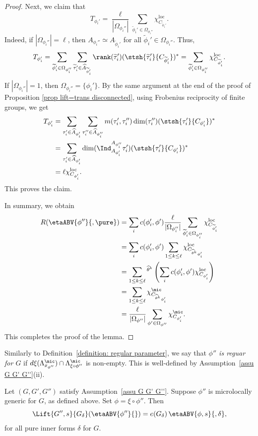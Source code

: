 \documentclass[11pt,letterpaper]{amsart}
\numberwithin{equation}{section}
\begin{document}
\begin{proof}
Next, we claim that 
\[ T_{\phi_i'}= \frac{\ell}{ |\Omega_{\phi_i''}|} \sum_{\widetilde{\phi}_i' \in \Omega_{\phi_i''}} \chi^\textrm{loc}_{C_{\widetilde{\phi}_i'}} .\]
Indeed, if $|\Omega_{\phi_i''}|= \ell$, then $A_{\phi_i''} \simeq  A_{\widetilde{\phi}_i'}$ for all $\widetilde{\phi}_i' \in \Omega_{\phi_i''}$. Thus, 
\[ T_{\phi_{i}'}= \sum_{\widetilde{\phi}_i' \in \Omega_{\phi_i''}} \sum_{\widetilde{\tau}_i' \in \widehat{A}_{\widetilde{\phi}_i'}} \rank(\widetilde{\tau}_i') (\stsh{\widetilde{\tau}_i'}{C_{\widetilde{\phi}_i'}})^{\ast} = \sum_{\widetilde{\phi}_i' \in \Omega_{\phi_i''}} \chi^\textrm{loc}_{C_{\widetilde{\phi}_i'}}.\]
If $|\Omega_{\phi_i''}|= 1$, then $\Omega_{\phi_i''}=\{\phi_i'\}$. By the same argument at the end of the proof of Proposition \ref{prop lift=trans disconnected}, using Frobenius reciprocity of finite groups, we get   
\begin{align*}
   T_{\phi_{i}'}&= \sum_{\tau_i' \in \widehat{A}_{\phi_i'}} \sum_{{\tau}_i'' \in \widehat{A}_{\phi_i''}} m({\tau}_i', \tau_i'') \dim(\tau_i'') (\stsh{{\tau}_i'}{C_{{\phi}_i'}})^{\ast}\\
   &= \sum_{{\tau}_i' \in \widehat{A}_{{\phi}_i'}} \dim(\Ind_{A_{\phi_i'}}^{A_{\phi_i''}}\tau_i')(\stsh{{\tau}_i'}{C_{{\phi}_i'}})^{\ast}\\
   &= \ell \chi^\textrm{loc}_{C_{\phi_i'}}.
\end{align*}
This proves the claim.

In summary, we obtain
\begin{align*}
    R( \etaABV{\phi''}{,\pure})& = \sum_{i}c(\phi_i', \phi') \frac{\ell}{ |\Omega_{\phi_i''}|} \sum_{\widetilde{\phi}_i' \in \Omega_{\phi_i''}} \chi^\textrm{loc}_{C_{\widetilde{\phi}_i'}}\\
    &= \sum_{i}c(\phi_i', \phi') \sum_{1 \leq k \leq \ell}\chi^\textrm{loc}_{C_{{}^{\widehat{\theta}^k} \phi_i'}} \\
    &=  \sum_{1 \leq k \leq \ell} {}^{\widehat{\theta}^k}\left(\sum_{i}c(\phi_i', \phi')\chi^\textrm{loc}_{C_{ \phi_i'}}\right)\\
    &= \sum_{1 \leq k \leq \ell}  \chi^{\mic}_{C_{{}^{\widehat{\theta}^k}\phi_i'}}\\
    &= \frac{\ell}{|\Omega_{\phi''}|} \sum_{\phi' \in \Omega_{\phi''}} \chi^{\mic}_{C_{\phi_i'}}.
\end{align*}
This completes the proof of the lemma.
\end{proof}


Similarly to Definition~\ref{definition: regular parameter}, we say that {\it $\phi''$ is reguar for $G$} if $d\xi(\Lambda_{x_{\phi''}}^\mic) \cap \Lambda_{\xi\circ\phi''}^\mic$ is non-empty.
This is well-defined by Assumption~\ref{assu G G' G''}(ii).
\begin{proposition}\label{prop: Lift of ABV disconnected}
    Let $(G,G',G'')$ satisfy  Assumption~\ref{assu G G' G''}.
Suppose  $\phi''$ is microlocally generic for $G$, as defined above. 
Set $\phi= \xi \circ \phi''$. 
Then
    \[
    \Lift{G'',s}{G_\delta}
    (\etaABV{\phi''}{})
    =
    e(G_\delta)\,
    \etaABV{\phi,s}{,\delta}  ,
    \]
for all pure inner forms $\delta$ for $G$.
\end{proposition}
\end{document}

